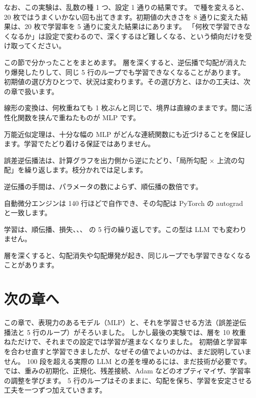 なお、この実験は、乱数の種 1 つ、設定 1 通りの結果です。
で種を変えると、20 枚ではうまくいかない回も出てきます。初期値の大きさを 8 通りに変えた結果は、20 枚で学習率を 5 通りに変えた結果はにあります。
「何枚で学習できなくなるか」は設定で変わるので、深くするほど難しくなる、という傾向だけを受け取ってください。

この節で分かったことをまとめます。
層を深くすると、逆伝播で勾配が消えたり爆発したりして、同じ 5 行のループでも学習できなくなることがあります。
初期値の選び方ひとつで、状況は変わります。その選び方と、ほかの工夫は、次の章で扱います。

\begin{summary}
\item 線形の変換は、何枚重ねても 1 枚ぶんと同じで、境界は直線のままです。間に活性化関数を挟んで重ねたものが MLP です。
\item 万能近似定理は、十分な幅の MLP がどんな連続関数にも近づけることを保証します。学習でたどり着ける保証ではありません。
\item 誤差逆伝播法は、計算グラフを出力側から逆にたどり、「局所勾配 $\times$ 上流の勾配」を繰り返します。枝分かれでは足します。
\item 逆伝播の手間は、パラメータの数によらず、順伝播の数倍です。
\item 自動微分エンジンは 140 行ほどで自作でき、その勾配は PyTorch の autograd と一致します。
\item 学習は、順伝播、損失、、、 の 5 行の繰り返しです。この型は LLM でも変わりません。
\item 層を深くすると、勾配消失や勾配爆発が起き、同じループでも学習できなくなることがあります。
\end{summary}

\section*{次の章へ}

この章で、表現力のあるモデル（MLP）と、それを学習させる方法（誤差逆伝播法と 5 行のループ）がそろいました。
しかし最後の実験では、層を 10 枚重ねただけで、それまでの設定では学習が進まなくなりました。
初期値と学習率を合わせ直すと学習できましたが、なぜその値でよいのかは、まだ説明していません。
100 段を超える実際の LLM との差を埋めるには、まだ技術が必要です。
では、重みの初期化、正規化、残差接続、Adam などのオプティマイザ、学習率の調整を学びます。
5 行のループはそのままに、勾配を保ち、学習を安定させる工夫を一つずつ加えていきます。


